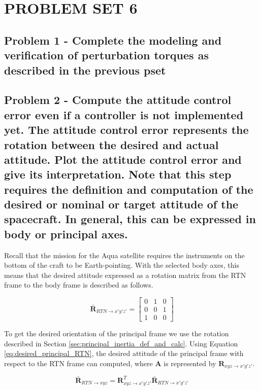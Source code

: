 \section{\Large PROBLEM SET 6}

\subsection{Problem 1 - Complete the modeling and verification of perturbation torques as described in the previous pset}

\subsection{Problem 2 - Compute the attitude control error even if a controller is not implemented yet. The attitude control error represents the rotation between the desired and actual attitude. Plot the attitude control error and give its interpretation. Note that this step requires the definition and computation of the desired or nominal or target attitude of the spacecraft. In general, this can be expressed in body or principal axes.}

Recall that the mission for the Aqua satellite requires the instruments on the bottom of the craft to be Earth-pointing. With the selected body axes, this means that the desired attitude expressed as a rotation matrix from the RTN frame to the body frame is described as follows.

\begin{equation*}
    \boldsymbol{\bar{R}}_{RTN \rightarrow x'y'z'} = \begin{bmatrix}
        0 & 1 & 0 \\ 0 & 0 & 1 \\ 1 & 0 & 0
    \end{bmatrix}
\end{equation*}

To get the desired orientation of the principal frame we use the rotation described in Section \ref{sec:principal_inertia_def_and_calc}. Using Equation \ref{eq:desired_principal_RTN}, the desired attitude of the principal frame with respect to the RTN frame can computed, where $\boldsymbol{A}$ is represented by $\boldsymbol{R}_{xyz \rightarrow x'y'z'}$.

\begin{equation} \label{eq:desired_principal_RTN}
    \boldsymbol{\bar{R}}_{RTN \rightarrow xyz} = \boldsymbol{R}_{xyz \rightarrow x'y'z'}^T \boldsymbol{\bar{R}}_{RTN \rightarrow x'y'z'}
\end{equation}

